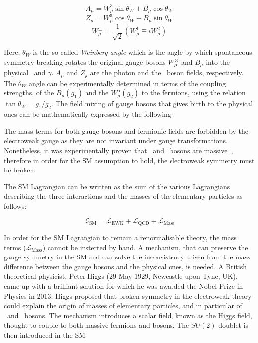 			\begin{equation}
			\label{eq:photon}
				A_{\mu} = W_{\mu}^3 \sin\theta_W  + B_{\mu}\cos \theta_W 
			\end{equation}
			\begin{equation}
			\label{eq:Zboson}
				Z_{\mu} = W_{\mu}^3\cos\theta_W  - B_{\mu} \sin \theta_W
			\end{equation}
			\begin{equation}
			\label{eq:Wboson}
				W_{\mu}^\pm = \frac{1}{\sqrt{2}} \displaystyle \left ( W_{\mu}^1 \mp i W_{\mu}^2 \right )
			\end{equation}

			\noindent Here, $\theta_W$ is the so-called \emph{Weinberg angle} which is the angle by which spontaneous symmetry breaking rotates the original gauge bosons $W_{\mu}^3$ and $B_{\mu}$ into the physical \Zboson\ and $\gamma$. $A_\mu$ and $Z_\mu$ are the photon and the \Zboson\ boson fields, respectively. The $\theta_W$ angle can be experimentally determined in terms of the coupling strengths, of the $B_{\mu}(g_1)$ and the $W_{\mu}^\alpha (g_2)$ to the fermions, using the relation $\tan\theta_W = g_1 / g_2 $. 
			The field mixing of gauge bosons that gives birth to the physical ones can be mathematically expressed by the following:

			The mass terms for both gauge bosons and fermionic fields are forbidden by the electroweak gauge as they are not invariant under gauge transformations. Nonetheless, it was experimentally proven that \Wboson\ and \Zboson\ bosons are massive~\cite{Pich2012}, therefore in order for the SM assumption to hold, the electroweak symmetry must be broken. 

			The SM Lagrangian can be written as the sum of the various Lagrangians describing the three interactions and the masses of the elementary particles as follows:

			\begin{equation}
			\label{eq:SM_Lagrangian}
				\mathcal{L_{\mathrm{SM}}} = \mathcal{L_{\mathrm{EWK}}} + \mathcal{L_{\mathrm{QCD}}} + \mathcal{L_{\mathrm{Mass}}}
			\end{equation}

			\noindent In order for the SM Lagrangian to remain a renormalisable theory, the mass terms ($\mathcal{L_{\mathrm{Mass}}}$) cannot be insterted by hand. A mechanism, that can preserve the gauge symmetry in the SM and can solve the inconsistency arisen from the mass difference between the gauge bosons and the physical ones, is needed. A British theoretical physicist, Peter Higgs (29 May 1929, Newcastle upon Tyne, UK), came up with a brilliant solution for which he was awarded the Nobel Prize in Physics in 2013. Higgs proposed that broken symmetry in the electroweak theory could explain the origin of masses of elementary particles, and in particular of \Wboson\ and \Zboson\ bosons. The mechanism introduces a scalar field, known as the Higgs field, thought to couple to both massive fermions and bosons. The $SU(2)$ doublet is then introduced in the SM;

